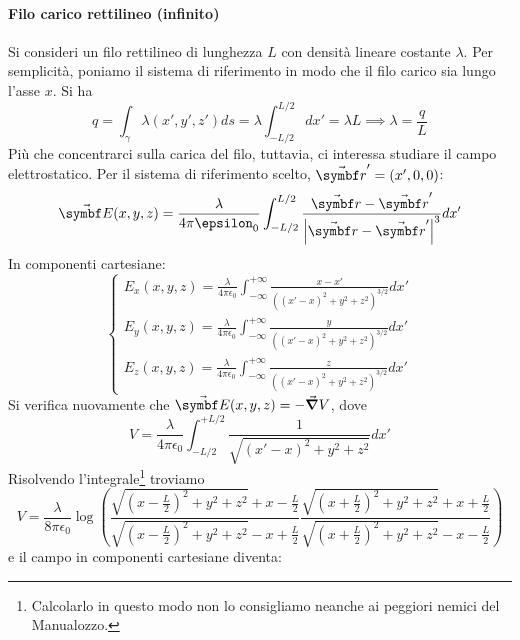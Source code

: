 \paragraph{Filo carico rettilineo (infinito)}%
	Si consideri un filo rettilineo di lunghezza $L$ con densità lineare costante $\lambda$. Per semplicità, poniamo il sistema di riferimento in modo che il filo carico sia lungo l'asse $x$. Si ha
	\begin{equation*}
		q=\int_{\gamma}\lambda(x',y',z')ds=\lambda\int_{-L/2}^{L/2}dx'=\lambda L\implies \lambda=\frac{q}{L}
	\end{equation*}
	 Più che concentrarci sulla carica del filo, tuttavia, ci interessa studiare il campo elettrostatico. Per il sistema di riferimento scelto, $\vba{r}'=\left(x',0,0\right)$:
	\begin{equation}
		\vba{E}(x,y,z)=\frac{\lambda}{4\pi\epsilon_0}\int_{-L/2}^{L/2}\frac{\vba{r}-\vba{r}'}{\abs{\vba{r}-\vba{r}'}^3}dx'
	\end{equation}
	In componenti cartesiane:
	\begin{equation*}
		\begin{cases}
			E_x(x,y,z)=\frac{\lambda}{4\pi\epsilon_0}\int_{-\infty}^{+\infty}\frac{x-x'}{\left((x'-x)^2+y^2+z^2\right)^{3/2}}dx'\\
			E_y(x,y,z)=\frac{\lambda}{4\pi\epsilon_0}\int_{-\infty}^{+\infty}\frac{y}{\left((x'-x)^2+y^2+z^2\right)^{3/2}}dx'\\
			E_z(x,y,z)=\frac{\lambda}{4\pi\epsilon_0}\int_{-\infty}^{+\infty}\frac{z}{\left((x'-x)^2+y^2+z^2\right)^{3/2}}dx'
		\end{cases}
	\end{equation*}
	Si verifica nuovamente che $\vba{E}(x,y,z)=-\grad{V}$, dove
	\begin{equation}
		V=\frac{\lambda}{4\pi\epsilon_0}\int_{-L/2}^{+L/2}\frac{1}{\sqrt{(x'-x)^2+y^2+z^2}}dx'
	\end{equation}
	Risolvendo l'integrale\footnote{Calcolarlo in questo modo non lo consigliamo neanche ai peggiori nemici del Manualozzo\texttrademark.} troviamo
	\begin{equation}
		V=\frac{\lambda}{8\pi\epsilon_0}\log\left(\frac{\sqrt{\left(x-\frac{L}{2}\right)^2+y^2+z^2}+x-\frac{L}{2}}{\sqrt{\left(x-\frac{L}{2}\right)^2+y^2+z^2}-x+\frac{L}{2}}\frac{\sqrt{\left(x+\frac{L}{2}\right)^2+y^2+z^2}+x+\frac{L}{2}}{\sqrt{\left(x+\frac{L}{2}\right)^2+y^2+z^2}-x-\frac{L}{2}}\right)
	\end{equation}
	e il campo in componenti cartesiane diventa:

